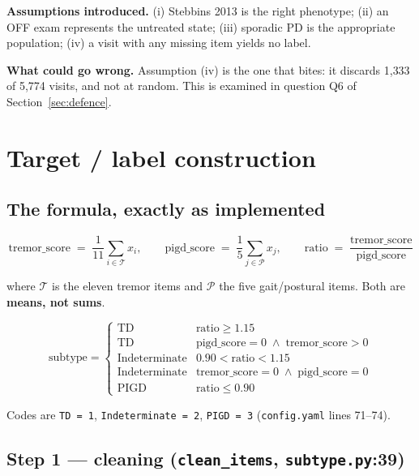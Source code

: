 \documentclass[11pt,a4paper]{article}
\newcommand{\code}[1]{\texttt{\small #1}}
\begin{document}
\textbf{Assumptions introduced.} (i) Stebbins 2013 is the right phenotype;
(ii) an OFF exam represents the untreated state; (iii) sporadic PD is the
appropriate population; (iv) a visit with any missing item yields no label.

\textbf{What could go wrong.} Assumption (iv) is the one that bites: it discards
1{,}333 of 5{,}774 visits, and not at random. This is examined in question Q6 of
Section~\ref{sec:defence}.

\section{Target / label construction}
\label{sec:label}

\subsection{The formula, exactly as implemented}

\[
  \text{tremor\_score} \;=\; \frac{1}{11}\sum_{i \in \mathcal{T}} x_i,
  \qquad
  \text{pigd\_score} \;=\; \frac{1}{5}\sum_{j \in \mathcal{P}} x_j,
  \qquad
  \text{ratio} \;=\; \frac{\text{tremor\_score}}{\text{pigd\_score}}
\]

where $\mathcal{T}$ is the eleven tremor items and $\mathcal{P}$ the five
gait/postural items. Both are \textbf{means, not sums}.

\[
\text{subtype} =
\begin{cases}
\text{TD} & \text{ratio} \geq 1.15 \\
\text{TD} & \text{pigd\_score} = 0 \;\wedge\; \text{tremor\_score} > 0 \\
\text{Indeterminate} & 0.90 < \text{ratio} < 1.15 \\
\text{Indeterminate} & \text{tremor\_score} = 0 \;\wedge\; \text{pigd\_score} = 0 \\
\text{PIGD} & \text{ratio} \leq 0.90
\end{cases}
\]

Codes are \code{TD = 1}, \code{Indeterminate = 2}, \code{PIGD = 3}
(\code{config.yaml} lines 71--74).

\subsection{Step 1 --- cleaning \quad (\code{clean\_items}, \code{subtype.py}:39)}
\end{document}
